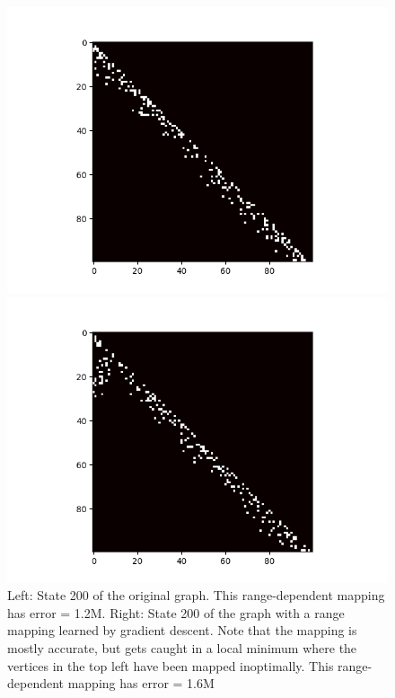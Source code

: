 \begin{figure}
    \begin{minipage}{0.49\textwidth}
        \begin{center}
            \includegraphics[scale=0.5]{figures/original_adj_100.png}
        \end{center}
    \end{minipage}
    \begin{minipage}{0.49\textwidth}
        \begin{center}
            \includegraphics[scale=0.5]{figures/sgd_adj_100.png}
        \end{center}
    \end{minipage}
	\caption{
        Left: State 200 of the original graph. 
        This range-dependent mapping has error = 1.2M.
        Right: State 200 of the graph with a range mapping learned by gradient descent.
        Note that the mapping is mostly accurate, but gets caught in a local minimum
        where the vertices in the top left have been mapped inoptimally.
        This range-dependent mapping has error = 1.6M
	}
    \label{fig:gradient-accuracy}
\end{figure}